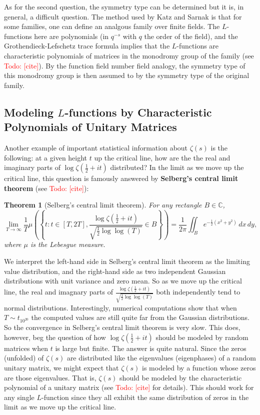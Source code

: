\documentclass[12pt]{book}
\newtheorem{theorem}{Theorem}[section]
\theoremstyle{definition}\newframedtheorem{method}{Method}
\newcommand{\C}{\mathbb{C}}
\newcommand{\z}{\zeta}
\newcommand{\<}{\langle}
\renewcommand{\>}{\rangle}
\newcommand{\todo}[1]{\textcolor{red}{\sf Todo: [#1]}}
\begin{document}
      As for the second question, the symmetry type can be determined but it is, in general, a difficult question. The method used by Katz and Sarnak is that for some families, one can define an analgous family over finite fields. The $L$-functions here are polynomials (in $q^{-s}$ with $q$ the order of the field), and the Grothendieck-Lefschetz trace formula implies that the $L$-functions are characteristic polynomials of matrices in the monodromy group of the family (see \todo{cite}). By the function field number field analogy, the symmetry type of this monodromy group is then assumed to by the symmetry type of the original family.
    \subsection*{Modeling $L$-functions by Characteristic Polynomials of Unitary Matrices}
      Another example of important statistical information about $\z(s)$ is the following: at a given height $t$ up the critical line, how are the the real and imaginary parts of $\log\z(\frac{1}{2}+it)$ distributed? In the limit as we move up the critical line, this question is famously answered by \textbf{Selberg's central limit theorem} (see \todo{cite}):

      \begin{theorem}[Selberg's central limit theorem]
        For any rectangle $B \in \C$,
        \[
          \lim_{T \to \infty}\frac{1}{T}\mu\left(\left\{t:t \in [T,2T],\frac{\log\z(\frac{1}{2}+it)}{\sqrt{\frac{1}{2}\log\log(T)}} \in B\right\}\right) = \frac{1}{2\pi}\iint_{B}e^{-\frac{1}{2}(x^{2}+y^{2})}\,dx\,dy,
        \]
        where $\mu$ is the Lebesgue measure.
      \end{theorem}

      We interpret the left-hand side in Selberg's central limit theorem as the limiting value distribution, and the right-hand side as two independent Gaussian distributions with unit variance and zero mean. So as we move up the critical line, the real and imagnary parts of $\frac{\log\z(\frac{1}{2}+it)}{\sqrt{\frac{1}{2}\log\log(T)}}$ both independently tend to normal distributions. Interestingly, numerical computations show that when $T \sim t_{10^{20}}$ the computed values are still quite far from the Gaussian distributions. So the convergence in Selberg's central limit theorem is very slow. This does, however, beg the question of how $\log\z(\frac{1}{2}+it)$ should be modeled by random matrices when $t$ is large but finite. The answer is quite natural. Since the zeros (unfolded) of $\z(s)$ are distributed like the eigenvalues (eigenphases) of a random unitary matrix, we might expect that $\z(s)$ is modeled by a function whose zeros are those eigenvalues. That is, $\z(s)$ should be modeled by the characteristic polynomial of a unitary matrix (see \todo{cite} for details). This should work for any single $L$-function since they all exhibit the same distribution of zeros in the limit as we move up the critical line.
\end{document}
